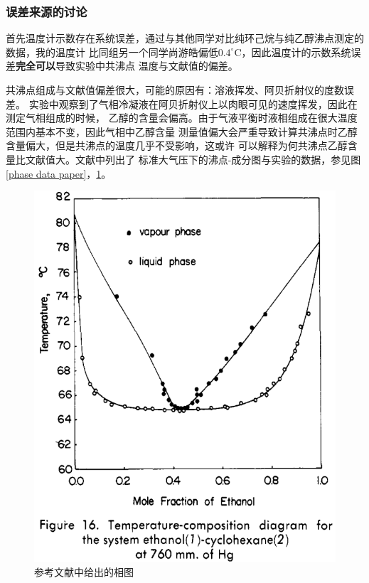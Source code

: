 \documentclass[12pt]{article}
\newcommand{\mr}[1]{\mathrm{#1}}
\def\celsius{^{\circ}\mr{C}}  %
\begin{document}
		\subsubsection{误差来源的讨论}
		\par 
		首先温度计示数存在系统误差，通过与其他同学对比纯环己烷与纯乙醇沸点测定的数据，我的温度计
		比同组另一个同学尚游皓偏低$0.4\celsius$，因此温度计的示数系统误差\textbf{完全可以}导致实验中共沸点
		温度与文献值的偏差。
		\par 
		共沸点组成与文献值偏差很大，可能的原因有：溶液挥发、阿贝折射仪的度数误差。
		实验中观察到了气相冷凝液在阿贝折射仪上以肉眼可见的速度挥发，因此在测定气相组成的时候，
		乙醇的含量会偏高。由于气液平衡时液相组成在很大温度范围内基本不变，因此气相中乙醇含量
		测量值偏大会严重导致计算共沸点时乙醇含量偏大，但是共沸点的温度几乎不受影响，这或许
		可以解释为何共沸点乙醇含量比文献值大。文献\citealt{doi:10.1021/je60019a024}中列出了
		标准大气压下的沸点-成分图与实验的数据，参见图\ref{phase data paper}，\ref{phase diagram paper}。
		\begin{figure}
			\centering
			\includegraphics[scale=0.5]{phase_diagram_paper.png}
			\caption{参考文献\citealt{doi:10.1021/je60019a024}中给出的相图}
			\label{phase diagram paper}
		\end{figure}
\end{document}
